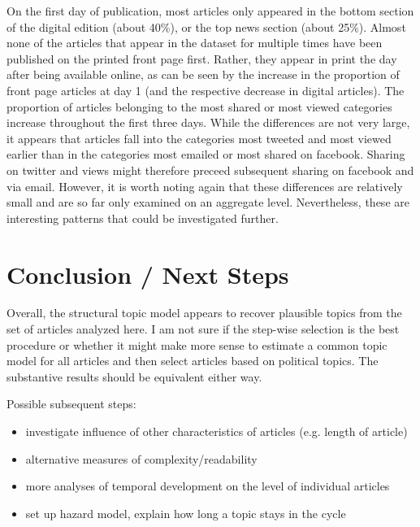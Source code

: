 \documentclass[12pt]{article}
\begin{document}
\begin{doublespace}
\begin{knitrout}
\end{knitrout}

On the first day of publication, most articles only appeared in the bottom section of the digital edition (about 40\%), or the top news section (about 25\%). Almost none of the articles that appear in the dataset for multiple times have been published on the printed front page first. Rather, they appear in print the day after being available online, as can be seen by the increase in the proportion of front page articles at day 1 (and the respective decrease in digital articles). The proportion of articles belonging to the most shared or most viewed categories increase throughout the first three days. While the differences are not very large, it appears that articles fall into the categories most tweeted and most viewed earlier than in the categories most emailed or most shared on facebook. Sharing on twitter and views might therefore preceed subsequent sharing on facebook and via email. However, it is worth noting again that these differences are relatively small and are so far only examined on an aggregate level. Nevertheless, these are interesting patterns that could be investigated further.


\clearpage
\section{Conclusion / Next Steps}
Overall, the structural topic model appears to recover plausible topics from the set of articles analyzed here. I am not sure if the step-wise selection is the best procedure or whether it might make more sense to estimate a common topic model for all articles and then select articles based on political topics. The substantive results should be equivalent either way.

Possible subsequent steps:
\begin{itemize}
  \item investigate influence of other characteristics of articles (e.g. length of article)
  \item alternative measures of complexity/readability
  \item more analyses of temporal development on the level of individual articles
  \item set up hazard model, explain how long a topic stays in the cycle
\end{itemize}



\end{doublespace}

\clearpage


\end{document}
